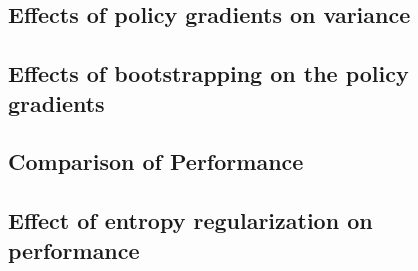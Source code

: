 \documentclass{article}
\begin{document}
\subsection{Effects of policy gradients on variance}
\subsection{Effects of bootstrapping on the policy gradients}
\subsection{Comparison of Performance}
\subsection{Effect of entropy regularization on performance}



\end{document}
